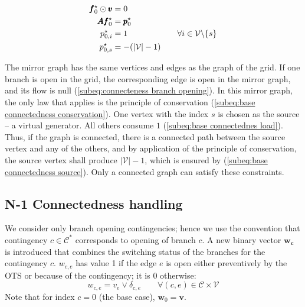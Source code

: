 \begin{subequations}
    \allowdisplaybreaks
    \begin{align}
        \pmb{f}^{\star}_{0}\odot \pmb{v} & = 0 \label{subeq:connecteness branch opening}                     &                                                                                      \\
        \pmb{A}\pmb{f}^{\star}_{0}       & = \pmb{p}^{\star}_{0}\label{subeq:base connectedness conservation} \\
        \
 p^{\star}_{0,i}               & = 1                                                               & \quad \forall i \in \mathcal{V}\backslash \{s\} \label{subeq:base connectednes load} \\
        p^{\star}_{0,s}                  & = - (\left|\mathcal{V}\right| - 1)                                & \label{subeq:base connectedness source}
    \end{align}
    \label{eq:base case connectedness}
\end{subequations}

The mirror graph has the same vertices and edges as the graph of the grid. If one branch is open in the grid, the corresponding edge is open in
the mirror graph, and its flow is null (\ref{subeq:connecteness branch opening}).
In this mirror graph, the only law that applies is the principle of conservation (\ref{subeq:base
connectedness conservation}). One vertex with the index $s$ is chosen as the
source -- a virtual generator. All others consume $1$ (\ref{subeq:base
connectednes load}). Thus, if the graph is connected, there is a connected path between
the source vertex and any of the others, and by application of the principle of
conservation, the source vertex shall produce $\left |\mathcal{V}\right|-1$,
which is ensured by (\ref{subeq:base connectedness source}). Only a connected graph can satisfy these constraints.

\subsection{N-1 Connectedness handling}
\label{ss:N-1 Connectedness} 
We consider only branch opening contingencies; hence we use the convention that contingency $c\in\mathcal{C}^{*}$ corresponds to opening of branch $c$. A new binary vector $\pmb{w_c}$ is introduced that combines
the switching status of the branches for the contingency $c$. $w_{c,e}$ has value 1 if the edge $e$ is open either preventively by the OTS or because of the contingency; it is 0 otherwise:
\begin{equation}
    w_{c,e}= v_{e}
    \vee \delta_{c,e} \quad \quad  \forall \left(c,e\right) \in \mathcal{C}\times\mathcal{V}
\end{equation}
Note that for index $c=0$ (the base case), $\pmb{w}_{0}=\pmb{v}$.

